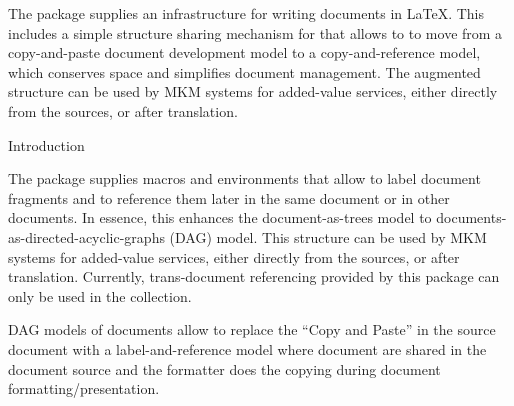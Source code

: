 The  package supplies an infrastructure for writing {\omdoc} documents in {\LaTeX}.
This includes a simple structure sharing mechanism for \sTeX that allows to to move from
a copy-and-paste document development model to a copy-and-reference model, which
conserves space and simplifies document management. The augmented structure can be used
by MKM systems for added-value services, either directly from the \sTeX sources, or
after translation.

\begin{sfragment}[id=sec:STR]{Introduction}

 The  package supplies macros and environments that allow to label document
 fragments and to reference them later in the same document or in other documents. In
 essence, this enhances the document-as-trees model to
 documents-as-directed-acyclic-graphs (DAG) model. This structure can be used by MKM
 systems for added-value services, either directly from the \sTeX sources, or after
 translation. Currently, trans-document referencing provided by this package can only be
 used in the \sTeX collection.

 DAG models of documents allow to replace the ``Copy and Paste'' in the source document
 with a label-and-reference model where document are shared in the document source and the
 formatter does the copying during document formatting/presentation.
\end{sfragment}

